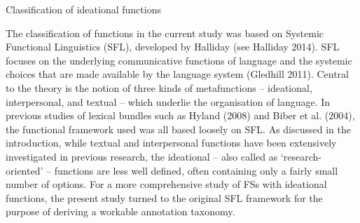 \begin{listWWNumxivleveli}
\item 
\begin{listWWNumxivlevelii}
\item 
\begin{stylelsSectionii}
Classification of ideational functions
\end{stylelsSectionii}
\end{listWWNumxivlevelii}
\end{listWWNumxivleveli}
\begin{styleStandard}
The classification of functions in the current study was based on Systemic Functional Linguistics (SFL), developed by Halliday (see Halliday 2014). SFL focuses on the underlying communicative functions of language and the systemic choices that are made available by the language system (Gledhill 2011). Central to the theory is the notion of three kinds of metafunctions – ideational, interpersonal, and textual – which underlie the organisation of language. In previous studies of lexical bundles such as Hyland (2008) and Biber et al. (2004), the functional framework used was all based loosely on SFL. As discussed in the introduction, while textual and interpersonal functions have been extensively investigated in previous research, the ideational – also called as ‘research-oriented’ – functions are less well defined, often containing only a fairly small number of options. For a more comprehensive study of FSs with ideational functions, the present study turned to the original SFL framework for the purpose of deriving a workable annotation taxonomy.
\end{styleStandard}

